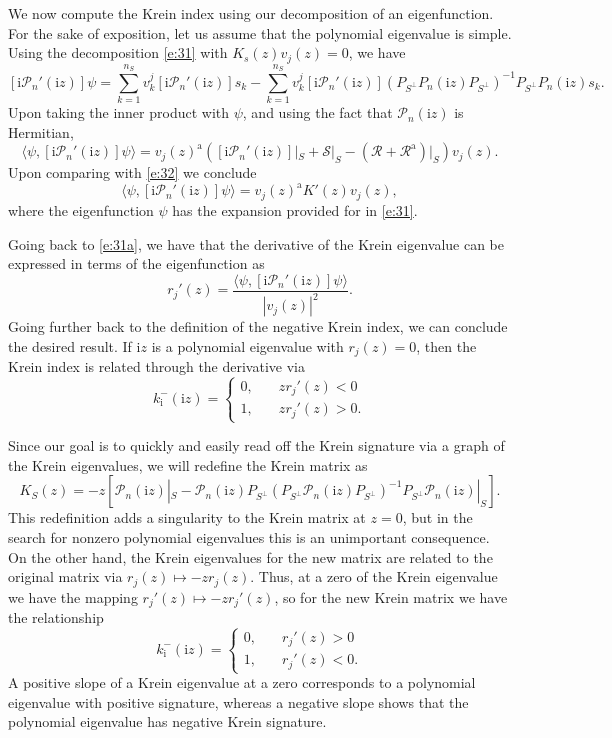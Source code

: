 \documentclass[review,onefignum,onetabnum]{siamart171218}
\newcommand{\rma}{\mathrm{a}}
\newcommand{\rmi}{\mathrm{i}}
\newcommand{\calP}{\mathcal{P}}
\newcommand{\calR}{\mathcal{R}}
\newcommand{\calS}{\mathcal{S}}
\newcommand{\vK}{\bm{\mathit{K}}}
\newcommand{\vv}{\bm{\mathit{v}}}
\newcommand{\vn}{\bm{\mathit{0}}}
\begin{document}
We now compute the Krein index using our decomposition of an eigenfunction.
For the sake of exposition, let us assume that the polynomial eigenvalue is
simple. Using the decomposition \cref{e:31} with $\vK_s(z)\vv_j(z)=\vn$, we
have
\[
[\rmi\calP_n'(\rmi z)]\psi=\sum_{k=1}^{n_S}v_k^j[\rmi\calP_n'(\rmi z)]s_k-
\sum_{k=1}^{n_S}v_k^j[\rmi\calP_n'(\rmi z)]
\left(P_{S^\perp}P_n(\rmi z)P_{S^\perp}\right)^{-1}P_{S^\perp}P_n(\rmi z)s_k.
\]
Upon taking the inner product with $\psi$, and using the fact that
$\calP_n(\rmi z)$ is Hermitian,
\[
\langle\psi,[\rmi\calP_n'(\rmi z)]\psi\rangle=
\vv_j(z)^\rma\left([\rmi\calP_n'(\rmi z)]|_S+\calS|_S-(\calR+\calR^\rma)|_S\right)\vv_j(z).
\]
Upon comparing with \cref{e:32} we conclude
\[
\langle\psi,[\rmi\calP_n'(\rmi z)]\psi\rangle=\vv_j(z)^\rma\vK'(z)\vv_j(z),
\]
where the eigenfunction $\psi$ has the expansion provided for in \cref{e:31}.

Going back to \cref{e:31a}, we have that the derivative of the Krein
eigenvalue can be expressed in terms of the eigenfunction as
\[
r_j'(z)=\frac{\langle\psi,[\rmi\calP_n'(\rmi z)]\psi\rangle}{|\vv_j(z)|^2}.
\]
Going further back to the
definition of the negative Krein index, we can conclude the desired result.
If $\rmi z$ is a polynomial eigenvalue with $r_j(z)=0$, then the Krein index
is related through the derivative via
\[
k_\rmi^-(\rmi z)=\begin{cases}0,\quad&zr_j'(z)<0\\1,\quad&zr_j'(z)>0.\end{cases}
\]

Since our goal is to quickly and easily read off the Krein signature via a
graph of the Krein eigenvalues, we will redefine the Krein matrix as
\[
\vK_S(z)=-z\left[\calP_n(\rmi z)|_S-%
\calP_n(\rmi z)P_{S^\perp}(P_{S^\perp}\calP_n(\rmi z)P_{S^\perp})^{-1}P_{S^\perp}\calP_n(\rmi z)|_{S}\right].
\]
This redefinition adds a singularity to the Krein matrix at $z=0$, but in the search for nonzero polynomial eigenvalues this is an unimportant consequence. On the other hand, the Krein eigenvalues for the new matrix are related to the original matrix
via $r_j(z)\mapsto -zr_j(z)$. Thus, at a zero of the Krein eigenvalue we have
the mapping $r_j'(z)\mapsto -zr_j'(z)$, so for the new Krein matrix we have
the relationship
\[
k_\rmi^-(\rmi z)=\begin{cases}0,\quad&r_j'(z)>0\\1,\quad&r_j'(z)<0.\end{cases}
\]
A positive slope of a Krein eigenvalue at a zero corresponds to a polynomial
eigenvalue with positive signature, whereas a negative slope shows that the
polynomial eigenvalue has negative Krein signature.
\end{document}
